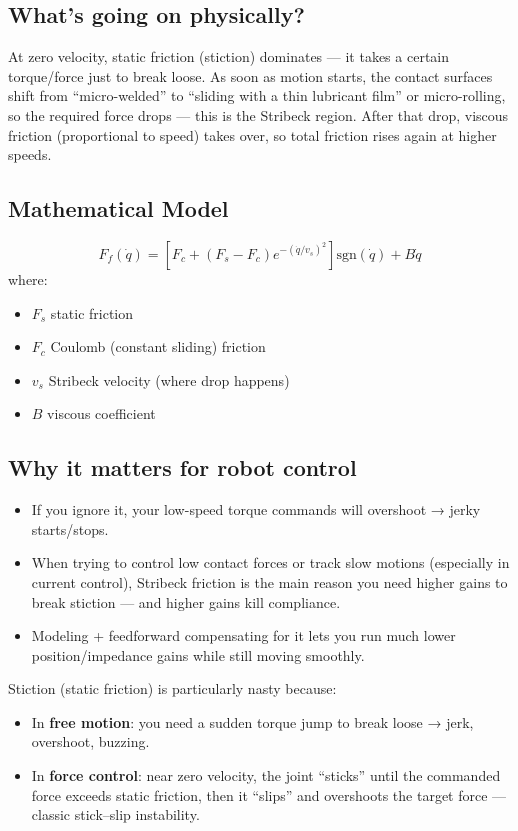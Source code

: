 \documentclass{article}
\begin{document}
\subsection{What’s going on physically?}

At zero velocity, static friction (stiction) dominates — it takes a certain torque/force just to break loose. As soon as motion starts, the contact surfaces shift from “micro-welded” to “sliding with a thin lubricant film” or micro-rolling, so the required force drops — this is the Stribeck region. After that drop, viscous friction (proportional to speed) takes over, so total friction rises again at higher speeds.

\subsection{Mathematical Model}
\begin{equation}
    F_f(\dot{q}) = \left[F_c + (F_s - F_c) e^{-(\dot{q}/v_s)^2}\right] \text{sgn}(\dot{q}) + B\dot{q}
\end{equation}
where:
\begin{itemize}
    \item $F_s$ static friction
    \item $F_c$ Coulomb (constant sliding) friction
    \item $v_s$ Stribeck velocity (where drop happens)
    \item $B$ viscous coefficient
\end{itemize} 

\subsection{Why it matters for robot control}
\begin{itemize}
    \item If you ignore it, your low-speed torque commands will overshoot → jerky starts/stops. 
    \item When trying to control low contact forces or track slow motions (especially in current control), Stribeck friction is the main reason you need higher gains to break stiction — and higher gains kill compliance. 
    \item Modeling + feedforward compensating for it lets you run much lower position/impedance gains while still moving smoothly.
\end{itemize}

Stiction (static friction) is particularly nasty because:
\begin{itemize}
    \item In \textbf{free motion}: you need a sudden torque jump to break loose → jerk, overshoot, buzzing.
    \item In \textbf{force control}: near zero velocity, the joint “sticks” until the commanded force exceeds static friction, then it “slips” and overshoots the target force — classic stick–slip instability.
\end{itemize}
\end{document}
